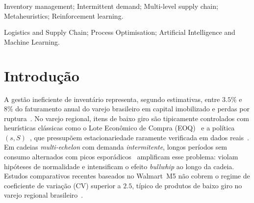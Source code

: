 \documentclass[a4paper,11pt]{article}
\begin{document}
\vspace{8mm}
\begin{abstract}
Classical inventory models, such as the Economic Order Quantity (EOQ)
and the two-threshold policy~$(s,S)$, rely on stationarity assumptions, a hypothesis that presents
systematic limitations for intermittent-demand items,
producing excess stock and frequent stockouts in Brazilian regional
retail.
Recent comparative studies based on datasets such as Walmart~M5 do
not cover this high-variability regime, characterized by a coefficient
of variation (CV) between $2.5$ and $5.4$, typical of slow-moving
products. This work presents a comparison of twelve inventory control policies
on proprietary operational data from Brazilian regional retail,
evaluated on five indicators: total cost, service level, stockout
rate, demand amplification along the supply chain (bullwhip effect),
and order frequency. The hybrid GA-DQN (Genetic Algorithm with Deep
Q-Network) architecture presented the most favorable trade-off among
the evaluated policies: lower cost than classical heuristics, a
bullwhip effect lower than $(s,S)$, and a stockout rate on par with
the best practical standalone policy, suggesting consistent
performance of the hybrid approach under high intermittent demand.
\end{abstract}

\bigskip
\begin{keywords}
Inventory management; Intermittent demand; Multi-level supply chain;
Metaheuristics; Reinforcement learning.

\bigskip
{}
Logistics and Supply Chain; Process Optimisation;
Artificial Intelligence and Machine Learning.
\end{keywords}

\section{Introdução}

A gestão ineficiente de inventário representa, segundo estimativas,
entre $3.5\%$ e $8\%$ do faturamento anual do varejo brasileiro em
capital imobilizado e perdas por ruptura~\citep{silver:2017}. No
varejo regional, itens de baixo giro são tipicamente controlados com
heurísticas clássicas como o Lote Econômico de Compra
(EOQ)~\citep{harris:1913} e a política~$(s,S)$~\citep{hadley:1963},
que pressupõem estacionariedade raramente verificada em dados
reais~\citep{silver:2017}. Em cadeias \textit{multi-echelon} com
demanda \emph{intermitente}, longos períodos sem consumo alternados
com picos esporádicos~\citep{croston:1972} amplificam esse problema:
violam hipóteses de normalidade e intensificam o efeito
\textit{bullwhip} ao longo da cadeia. Estudos comparativos recentes
baseados no Walmart~M5 não cobrem o regime de coeficiente de
variação (CV) superior a $2.5$, típico de produtos de baixo giro
no varejo regional brasileiro~\citep{syntetos:2001}.
\end{document}
